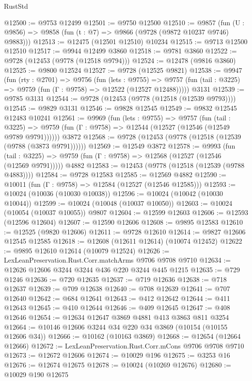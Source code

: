 \begin{lexlean}{RustStd}
\begin{coremodule}
{\begin{coremodule}
{{{{{{{{{{{{{{{{{{{{{{{{{{@12500 := @9753 @12499
@12501 := @9750 @12500
@12510 := @9857
    (fun (U : @9856) => @9858 (fun (t : @7) => @9866 (@9728 (@9872 @10237 @9746) @9883)))
@12513 := @12475 (@12501 @12510) @10234
@12515 := @9713 @12500 @12510
@12517 := @9944 @12499 @3860
@12518 := @9781 @3860
@12522 := @9728 (@12453 (@9778 (@12518 @9794)))
@12524 := @12478 (@9816 @3860)
@12525 := @9800 @12524
@12527 := @9728 (@12525 @9821)
@12538 := @9947
    (fun (rty : @2701) =>
    @9756
      (fun (lets : @9755) =>
      @9757 (fun (tail : @3225) => @9759 (fun (Γ : @9758) => @12522 (@12527 @12488)))))
    @3131
@12539 := @9785 @3131
@12544 := @9728 (@12453 (@9778 (@12518 (@12539 @9793))))
@12545 := @9829 @3131
@12546 := @9828 @12545
@12549 := @9832 @12545 @12483 @10241
@12561 := @9969
    (fun (lets : @9755) =>
    @9757
      (fun (tail : @3225) =>
      @9759 (fun (Γ : @9758) => @12544 (@12527 (@12546 (@12549 @9789 @9791))))))
    @3872
@12568 := @9728 (@12453 (@9778 (@12518 (@12539 (@9788 (@3873 @9791))))))
@12569 := @12549 @3872
@12578 := @9993
    (fun (tail : @3225) => @9759 (fun (Γ : @9758) => @12568 (@12527 (@12546 (@12569 @9791)))))
    @4882
@12583 := @12453 (@9778 (@12518 (@12539 (@9788 @4883))))
@12584 := @9728 @12583
@12585 := @12569 @4882
@12590 := @10011 (fun (Γ : @9758) => @12584 (@12527 (@12546 @12585)))
@12593 := @10024 (@10036 (@10030 @10038))
@12596 := @10024 (@10042 (@10030 @10044))
@12599 := @10024 (@10048 (@10037 @10050))
@12603 := @10024 (@10054 (@10037 @10055)) @9807
@12604 := @12599 @12603
@12606 := @12593 (@12596 @12604)
@12607 := @12590 @12606
@12608 := @9895 @12583
@12610 := @12525 (@9820 @12606)
@12611 := @9728 @12610
@12614 := @9827 @12606 @12545 @12585
@12618 := @12608 (@12611 @12614) (@10074 @12452)
@12622 := @9895 @12610 @12614 (@10079 @12524)
@12626 := LexLeanPreservation.Rust.Corr.matchArms @9706 @9708 @9710
@12634 := @12626 @12606 @3244 @3244 @436 @220 @3244 @445 @1215
@12635 := @729 @1246
@12636 := @720 @12635
@12637 := @719 @12636
@12638 := @718 @12637
@12639 := @709 @12638
@12640 := @708 @12639
@12641 := @707 @12640
@12642 := @684 @12641
@12643 := @412 @12642
@12644 := @411 @12643
@12645 := @410 @12644
@12646 := @409 @12645
@12647 := @408 @12646
@12654 := @12634 @12647 @3869 @4881 @413 @3863 @811 @3254
@12664 := @10146 @12606 @3244 @34 @220 @34 @3869 (@10154 (@10155 @12606 @34))
@12666 := @10162 (@10163 @3869)
@12668 := @12654 (@12664 @12666)
@12672 := LexLeanPreservation.Rust.Corr.mCons @9706 @9708 @9710
@12673 := @12672 @12606
@12674 := @10029 @196
@12675 := @3253 @16
@12676 := @12674 @12675
@12678 := @10024 (@10269 @12676)
@12680 := @10029 @190 @12675
}}}}}}}}}}}}}}}}}}}}}}}}}}
\end{coremodule}}
\end{coremodule}
\end{lexlean}
